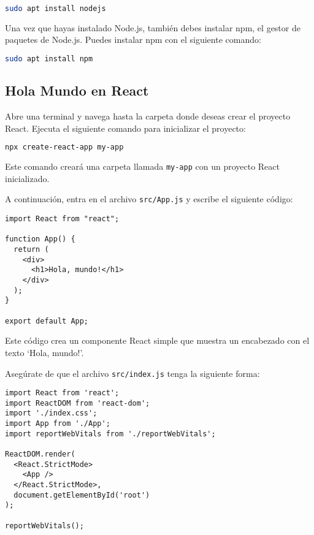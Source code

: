 \documentclass[executivepaper]{article}
\begin{document}
\begin{lstlisting}[language=bash]
sudo apt install nodejs
\end{lstlisting}

Una vez que hayas instalado Node.js, también debes instalar npm, el gestor de paquetes de Node.js. Puedes instalar npm con el siguiente comando:

\begin{lstlisting}[language=bash]
sudo apt install npm
\end{lstlisting}

\subsection{Hola Mundo en React}

Abre una terminal y navega hasta la carpeta donde deseas crear el proyecto React. Ejecuta el siguiente comando para inicializar el proyecto:

\begin{lstlisting}[language=bash]
npx create-react-app my-app
\end{lstlisting}

Este comando creará una carpeta llamada \lstinline{my-app} con un proyecto React inicializado.

A continuación, entra en el archivo \lstinline{src/App.js} y escribe el siguiente código:

\begin{lstlisting}
import React from "react";

function App() {
  return (
    <div>
      <h1>Hola, mundo!</h1>
    </div>
  );
}

export default App;
\end{lstlisting}

Este código crea un componente React simple que muestra un encabezado con el texto \enquote*{Hola, mundo!}.

Asegúrate de que el archivo \lstinline{src/index.js} tenga la siguiente forma:

\begin{lstlisting}
import React from 'react';
import ReactDOM from 'react-dom';
import './index.css';
import App from './App';
import reportWebVitals from './reportWebVitals';

ReactDOM.render(
  <React.StrictMode>
    <App />
  </React.StrictMode>,
  document.getElementById('root')
);

reportWebVitals();
\end{lstlisting}
\end{document}
